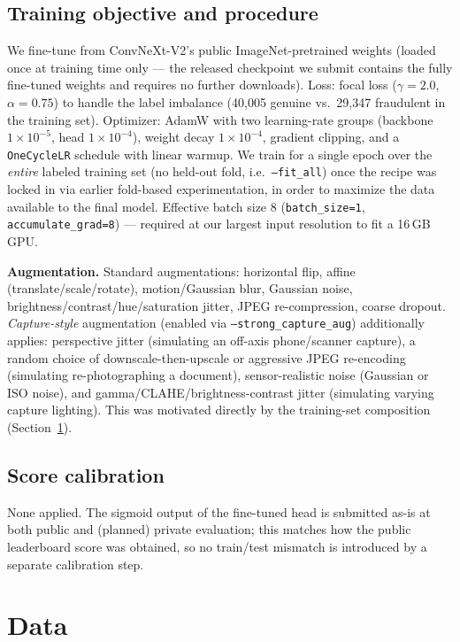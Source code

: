 \documentclass[11pt,a4paper]{article}
\begin{document}
\subsection{Training objective and procedure}
We fine-tune from ConvNeXt-V2's public ImageNet-pretrained weights (loaded
once at training time only — the released checkpoint we submit contains the
fully fine-tuned weights and requires no further downloads). Loss: focal loss
($\gamma=2.0$, $\alpha=0.75$) to handle the label imbalance
(40{,}005 genuine vs.\ 29{,}347 fraudulent in the training set). Optimizer:
AdamW with two learning-rate groups (backbone $1\times10^{-5}$, head
$1\times10^{-4}$), weight decay $1\times10^{-4}$, gradient clipping, and a
\texttt{OneCycleLR} schedule with linear warmup. We train for a single epoch
over the \emph{entire} labeled training set (no held-out fold, i.e.\
\texttt{--fit\_all}) once the recipe was locked in via earlier
fold-based experimentation, in order to maximize the data available to the
final model. Effective batch size 8 (\texttt{batch\_size=1},
\texttt{accumulate\_grad=8}) — required at our largest input resolution to
fit a 16\,GB GPU.

\textbf{Augmentation.} Standard augmentations: horizontal flip, affine
(translate/scale/rotate), motion/Gaussian blur, Gaussian noise,
brightness/contrast/hue/saturation jitter, JPEG re-compression, coarse
dropout. \emph{Capture-style} augmentation (enabled via
\texttt{--strong\_capture\_aug}) additionally applies: perspective jitter
(simulating an off-axis phone/scanner capture), a random choice of
downscale-then-upscale or aggressive JPEG re-encoding (simulating
re-photographing a document), sensor-realistic noise (Gaussian or ISO noise),
and gamma/CLAHE/brightness-contrast jitter (simulating varying capture
lighting). This was motivated directly by the training-set composition
(Section~\ref{sec:data}).

\subsection{Score calibration}
None applied. The sigmoid output of the fine-tuned head is submitted as-is at
both public and (planned) private evaluation; this matches how the public
leaderboard score was obtained, so no train/test mismatch is introduced by a
separate calibration step.

\section{Data}
\label{sec:data}
\end{document}
